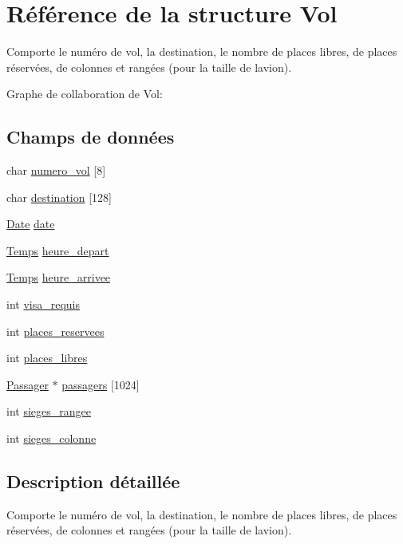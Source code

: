 \hypertarget{structVol}{}\section{Référence de la structure Vol}
\label{structVol}


Comporte le numéro de vol, la destination, le nombre de places libres, de places réservées, de colonnes et rangées (pour la taille de l\textquotesingle{}avion).  




Graphe de collaboration de Vol\+:
\subsection*{Champs de données}
\begin{DoxyCompactItemize}
\item 
char \hyperlink{structVol_a232eef7acb107fe79c1f91cd08fa4f03}{numero\+\_\+vol} \mbox{[}8\mbox{]}
\item 
char \hyperlink{structVol_a1b7b37d7664fce7454e30b7ebbdb18a5}{destination} \mbox{[}128\mbox{]}
\item 
\hyperlink{structDate}{Date} \hyperlink{structVol_ae4f2e6f74614e8103f73fc16f3d345fb}{date}
\item 
\hyperlink{structTemps}{Temps} \hyperlink{structVol_a8f76dcdd0bc26f6f95a27df539dd76dc}{heure\+\_\+depart}
\item 
\hyperlink{structTemps}{Temps} \hyperlink{structVol_ae591d22a45cc86b4b85a329fd2203030}{heure\+\_\+arrivee}
\item 
int \hyperlink{structVol_a3995b340d68374bb5c7610735d5488d3}{visa\+\_\+requis}
\item 
int \hyperlink{structVol_a05ab0ca92475372af79a2146892c04fb}{places\+\_\+reservees}
\item 
int \hyperlink{structVol_a6e9793ce6360640ce08e2bc4cbcbdc5c}{places\+\_\+libres}
\item 
\hyperlink{structPassager}{Passager} $\ast$ \hyperlink{structVol_ae27fdb22adee0ed32a7046f20599ab85}{passagers} \mbox{[}1024\mbox{]}
\item 
int \hyperlink{structVol_a149b23d6ee40c47798d0fdbd953b2e1b}{sieges\+\_\+rangee}
\item 
int \hyperlink{structVol_a6ddd68e23a8395ab6e8eda27e1af7fc1}{sieges\+\_\+colonne}
\end{DoxyCompactItemize}


\subsection{Description détaillée}
Comporte le numéro de vol, la destination, le nombre de places libres, de places réservées, de colonnes et rangées (pour la taille de l\textquotesingle{}avion). 

